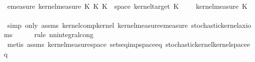 \begin{isabellebody}
\ \ \isamarkupfalse%
\ \isamarkupfalse%
\ {\isachardoublequoteopen}emeasure\ {\isacharparenleft}{\kern0pt}kernel{\isacharunderscore}{\kern0pt}measure\ {\isacharparenleft}{\kern0pt}K\ {\isasymcirc}\isactrlsub K\ K\ {\isasymomega}{\isacharparenright}{\kern0pt}\ {\isacharparenleft}{\kern0pt}space\ {\isacharparenleft}{\kern0pt}kernel{\isacharunderscore}{\kern0pt}target\ K\ {\isacharequal}{\kern0pt}\ {\isasymintegral}\isactrlsup {\isacharplus}{\kern0pt}\ {\isasymomega}\ {}\ {\isasympartial}kernel{\isacharunderscore}{\kern0pt}measure\ K\ {\isasymomega}{\isachardoublequoteclose}\isanewline
\ \ \ \ \isamarkupfalse%
\ {\isacharparenleft}{\kern0pt}simp\ only{\isacharcolon}{\kern0pt}\ assms{\isacharparenleft}{\kern0pt}{}{\isacharcomma}{\kern0pt}{}{\isacharparenright}{\kern0pt}\ kernel{\isacharunderscore}{\kern0pt}comp{\isacharunderscore}{\kern0pt}kernel\ kernel{\isacharunderscore}{\kern0pt}measure{\isacharunderscore}{\kern0pt}emeasure\ stochastic{\isacharunderscore}{\kern0pt}kernel{\isachardot}{\kern0pt}axioms{\isacharparenleft}{\kern0pt}{}{\isacharparenright}{\kern0pt}{\isacharparenright}{\kern0pt}\isanewline
\ \ \ \ \isamarkupfalse%
\ {\isacharparenleft}{\kern0pt}rule\ nn{\isacharunderscore}{\kern0pt}integral{\isacharunderscore}{\kern0pt}cong{\isacharparenright}{\kern0pt}\isanewline
\ \ \ \ \isamarkupfalse%
\ {\isacharparenleft}{\kern0pt}metis\ assms{\isacharparenleft}{\kern0pt}{}{\isacharcomma}{\kern0pt}{}{\isacharparenright}{\kern0pt}\ kernel{\isacharunderscore}{\kern0pt}measure{\isacharunderscore}{\kern0pt}space\ sets{\isacharunderscore}{\kern0pt}eq{\isacharunderscore}{\kern0pt}imp{\isacharunderscore}{\kern0pt}space{\isacharunderscore}{\kern0pt}eq\ stochastic{\isacharunderscore}{\kern0pt}kernel{\isachardot}{\kern0pt}kernel{\isacharunderscore}{\kern0pt}space{\isacharunderscore}{\kern0pt}eq{\isacharunderscore}{\kern0pt}{}{\isacharparenright}{\kern0pt}\isanewline
\ \ \isamarkupfalse%
\ \isamarkupfalse%
\ {\isachardoublequoteopen}{\isachardot}{\kern0pt}{\isachardot}{\kern0pt}{\isachardot}{\kern0pt}\ {\isacharequal}{\kern0pt}\ {}{\isachardoublequoteclose}\isanewline
\ \ \ \ \isamarkupfalse%
\ {\isasymomega}\ \isamarkupfalse%

\end{isabellebody}
